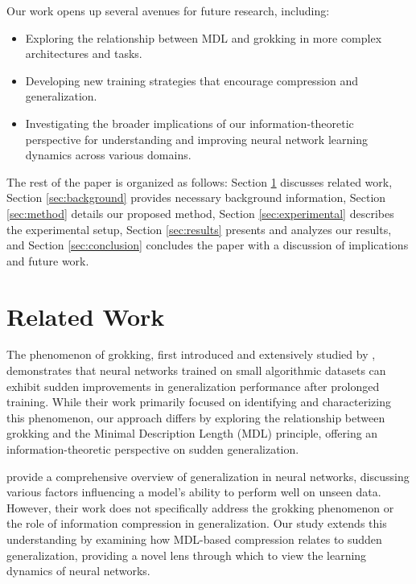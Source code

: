 \documentclass{article} %
\begin{document}
Our work opens up several avenues for future research, including:

\begin{itemize}
    \item Exploring the relationship between MDL and grokking in more complex architectures and tasks.
    \item Developing new training strategies that encourage compression and generalization.
    \item Investigating the broader implications of our information-theoretic perspective for understanding and improving neural network learning dynamics across various domains.
\end{itemize}

The rest of the paper is organized as follows: Section \ref{sec:related} discusses related work, Section \ref{sec:background} provides necessary background information, Section \ref{sec:method} details our proposed method, Section \ref{sec:experimental} describes the experimental setup, Section \ref{sec:results} presents and analyzes our results, and Section \ref{sec:conclusion} concludes the paper with a discussion of implications and future work.

\section{Related Work}
\label{sec:related}

The phenomenon of grokking, first introduced and extensively studied by \citet{Power2022GrokkingGB}, demonstrates that neural networks trained on small algorithmic datasets can exhibit sudden improvements in generalization performance after prolonged training. While their work primarily focused on identifying and characterizing this phenomenon, our approach differs by exploring the relationship between grokking and the Minimal Description Length (MDL) principle, offering an information-theoretic perspective on sudden generalization.

\citet{goodfellow2016deep} provide a comprehensive overview of generalization in neural networks, discussing various factors influencing a model's ability to perform well on unseen data. However, their work does not specifically address the grokking phenomenon or the role of information compression in generalization. Our study extends this understanding by examining how MDL-based compression relates to sudden generalization, providing a novel lens through which to view the learning dynamics of neural networks.
\end{document}

